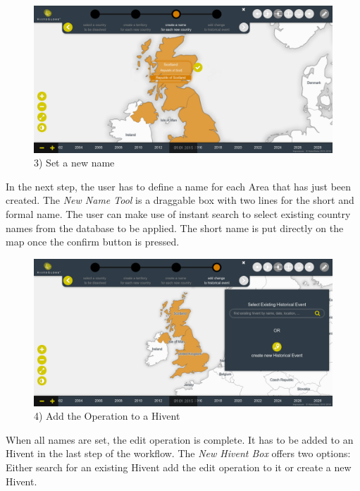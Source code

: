 \vspace{1em}
\begin{minipage}[t]{0.47\textwidth}

  \begin{figure}[H]
    \centering
    \includegraphics[width=1.0\textwidth]{graphics/development/user_interface_design_process/5_set_new_name.png}
    \caption{3) Set a new name}
    \label{fig:final_5_set_new_name}
  \end{figure}

  In the next step, the user has to define a name for each Area that has just been created. The \emph{New Name Tool} is a draggable box with two lines for the short and formal name. The user can make use of instant search to select existing country names from the database to be applied. The short name is put directly on the map once the confirm button is pressed.

\end{minipage}    %
\hspace{1.5em}    %
\begin{minipage}[t]{0.47\textwidth}

  \begin{figure}[H]
    \centering
    \includegraphics[width=1.0\textwidth]{graphics/development/user_interface_design_process/6_add_change_to_hivent_1.png}
    \caption{4) Add the Operation to a Hivent}
    \label{fig:final_6_add_change_to_hivent_1}
  \end{figure}

  When all names are set, the edit operation is complete. It has to be added to an Hivent in the last step of the workflow. The \emph{New Hivent Box} offers two options: Either search for an existing Hivent add the edit operation to it or create a new Hivent.

\end{minipage}


